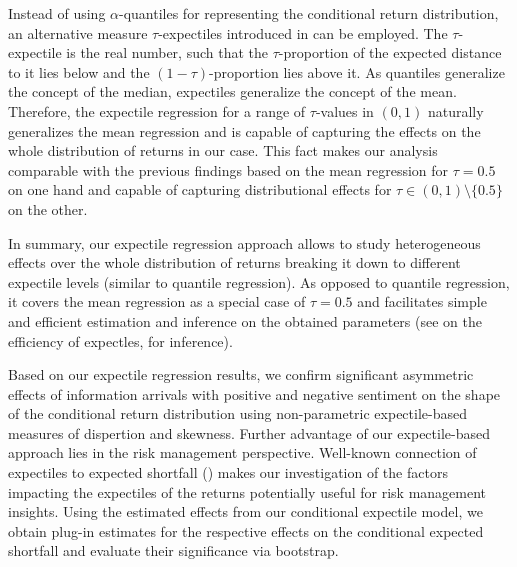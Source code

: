 \documentclass[]{article}
\begin{document}
Instead of using $\alpha$-quantiles for representing the conditional return distribution, an alternative measure $\tau$-expectiles introduced in \cite{Newey1987} can be employed. The $\tau$-expectile is the real number, such that the $\tau$-proportion of the expected distance to it lies below and the $(1-\tau)$-proportion lies above it. As quantiles generalize the concept of the median, expectiles generalize the concept of the mean. Therefore, the expectile regression for a range of $\tau$-values in $(0,1)$ naturally generalizes the mean regression and is capable of capturing the effects on the whole distribution of returns in our case. This fact makes our analysis comparable with the previous findings based on the mean regression for $\tau=0.5$ on one hand and capable of capturing distributional effects for $\tau\in (0,1)\setminus\{0.5\}$ on the other.

In summary, our expectile regression approach allows to study heterogeneous effects over the whole distribution of returns breaking it down to different expectile levels (similar to quantile regression). As opposed to quantile regression, it covers the mean regression as a special case of $\tau=0.5$ and facilitates simple and efficient estimation and inference on the obtained parameters (see \cite{waltrup2015} on the efficiency of expectles, \cite{Barry2018} for inference).


Based on our expectile regression results, we confirm significant asymmetric effects of information arrivals with positive and negative sentiment on the shape of the conditional return distribution using non-parametric expectile-based measures of dispertion and skewness. Further advantage of our expectile-based approach lies in the risk management perspective. Well-known connection of expectiles to expected shortfall (\cite{Taylor2008}) makes our investigation of the factors impacting the expectiles of the returns potentially useful for risk management insights. Using the estimated effects from our conditional expectile model, we obtain plug-in estimates for the respective effects on the conditional expected shortfall and evaluate their significance via bootstrap.
\end{document}

